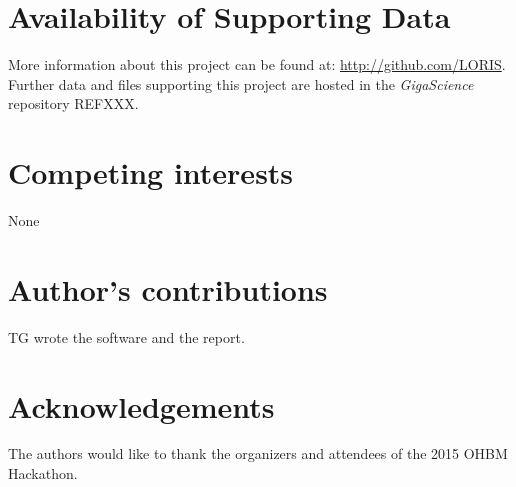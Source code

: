 \documentclass[twocolumn]{bmcart}%
\begin{document}

\begin{backmatter}

\section*{Availability of Supporting Data}
More information about this project can be found at: \url{http://github.com/LORIS}. Further data and files supporting this project are hosted in the \emph{GigaScience} repository REFXXX.

\section*{Competing interests}
None

\section*{Author's contributions}
TG wrote the software and the report.

\section*{Acknowledgements}
The authors would like to thank the organizers and attendees of the 2015
OHBM Hackathon.

  
  


\end{backmatter}
\end{document}
